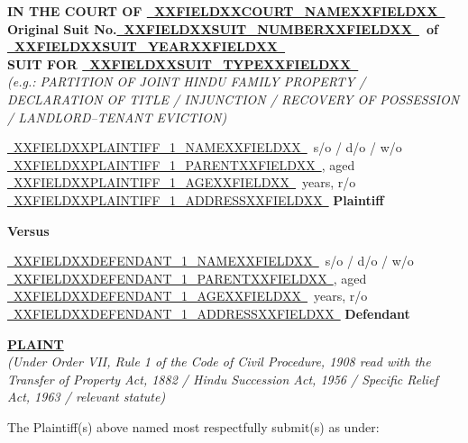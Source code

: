 \documentclass[12pt,a4paper]{article}
\newcommand{\fillline}[1]{\underline{~#1~}}
\begin{document}
\begin{center}
  {\bfseries IN THE COURT OF \fillline{XXFIELDXXCOURT_NAMEXXFIELDXX}}\\[4pt]
  {\bfseries Original Suit No.\fillline{XXFIELDXXSUIT_NUMBERXXFIELDXX}\ of \fillline{XXFIELDXXSUIT_YEARXXFIELDXX}}\\[6pt]
  \textbf{SUIT FOR \fillline{XXFIELDXXSUIT_TYPEXXFIELDXX}}\\
  \textit{(e.g.: PARTITION OF JOINT HINDU FAMILY PROPERTY /
   DECLARATION OF TITLE / INJUNCTION / RECOVERY OF POSSESSION /
   LANDLORD--TENANT EVICTION)}
\end{center}

\vspace{14pt}

\noindent \fillline{XXFIELDXXPLAINTIFF_1_NAMEXXFIELDXX}\ s/o / d/o / w/o \fillline{XXFIELDXXPLAINTIFF_1_PARENTXXFIELDXX},
aged \fillline{XXFIELDXXPLAINTIFF_1_AGEXXFIELDXX}\ years, r/o \fillline{XXFIELDXXPLAINTIFF_1_ADDRESSXXFIELDXX}
\hfill\textbf{Plaintiff}

\vspace{10pt}
\begin{center}\textbf{Versus}\end{center}
\vspace{10pt}

\noindent \fillline{XXFIELDXXDEFENDANT_1_NAMEXXFIELDXX}\ s/o / d/o / w/o \fillline{XXFIELDXXDEFENDANT_1_PARENTXXFIELDXX},
aged \fillline{XXFIELDXXDEFENDANT_1_AGEXXFIELDXX}\ years, r/o \fillline{XXFIELDXXDEFENDANT_1_ADDRESSXXFIELDXX}
\hfill\textbf{Defendant}

\vspace{16pt}

\begin{center}
  \textbf{\uline{PLAINT}}\\[4pt]
  \textit{(Under Order VII, Rule 1 of the Code of Civil Procedure, 1908 read
  with the Transfer of Property Act, 1882 / Hindu Succession Act, 1956 /
  Specific Relief Act, 1963 / relevant statute)}
\end{center}

The Plaintiff(s) above named most respectfully submit(s) as under:

\vspace{8pt}
\end{document}
